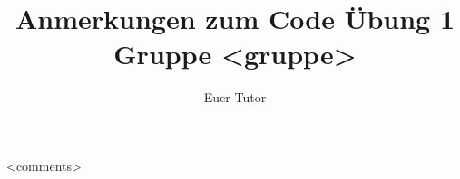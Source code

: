 \documentclass[a4paper,10pt]{scrartcl}
\title{Anmerkungen zum Code Übung 1 Gruppe <gruppe>}
\author{Euer Tutor}
\begin{document}
\maketitle

<comments>
\end{document}
